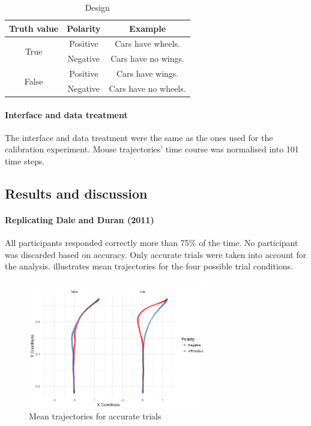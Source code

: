 \documentclass{article}
\begin{document}
\begin{table}[h]
\centering
\begin{tabular}{ccc}
Truth value & Polarity & Example \\
\hline
\multirow{2}{*}{True} & Positive & Cars have wheels.\\ 
 & Negative & Cars have no wings.\\ 
\hline
\multirow{2}{*}{False} & Positive & Cars have wings.\\ 
 & Negative & Cars have no wheels.\\
\end{tabular}
\caption{Design} \label{table:exampleDD}
\end{table}


\paragraph{Interface and data treatment}
The interface and data treatment were the same as the ones used for the calibration experiment. Mouse trajectories' time course was normalised into 101 time steps.

\subsection{Results and discussion}
\paragraph{Replicating Dale and Duran (2011)}
All participants responded correctly more than 75\% of the time. No participant was discarded based on accuracy.  Only accurate trials were taken into account for the analysis.  illustrates mean trajectories for the four possible trial conditions.
\begin{figure}
\centering
\includegraphics[width=0.7\textwidth]{negation-data-mean-trajectory.png}
\caption{Mean trajectories for accurate trials} \label{fig:mean.trajectory-negation}
\end{figure}
\end{document}
